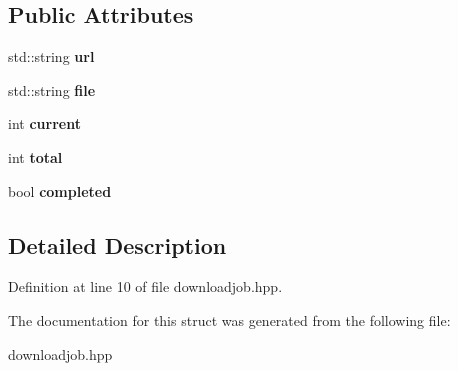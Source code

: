 \subsection*{Public Attributes}
\begin{DoxyCompactItemize}
\item 
\hypertarget{struct_download_job_a72c19444d6a3110124ed78a6b335e443}{std\-::string {\bfseries url}}\label{struct_download_job_a72c19444d6a3110124ed78a6b335e443}

\item 
\hypertarget{struct_download_job_a0731eb84fbe6d54d677d1132a54eefa5}{std\-::string {\bfseries file}}\label{struct_download_job_a0731eb84fbe6d54d677d1132a54eefa5}

\item 
\hypertarget{struct_download_job_a446b49f06dd1fff42260bcca3b9c1c03}{int {\bfseries current}}\label{struct_download_job_a446b49f06dd1fff42260bcca3b9c1c03}

\item 
\hypertarget{struct_download_job_a244e86498b90238f33501395608db188}{int {\bfseries total}}\label{struct_download_job_a244e86498b90238f33501395608db188}

\item 
\hypertarget{struct_download_job_ab467c8476dd69b58e9adef121919ea4a}{bool {\bfseries completed}}\label{struct_download_job_ab467c8476dd69b58e9adef121919ea4a}

\end{DoxyCompactItemize}


\subsection{Detailed Description}


Definition at line 10 of file downloadjob.\-hpp.



The documentation for this struct was generated from the following file\-:\begin{DoxyCompactItemize}
\item 
downloadjob.\-hpp\end{DoxyCompactItemize}
